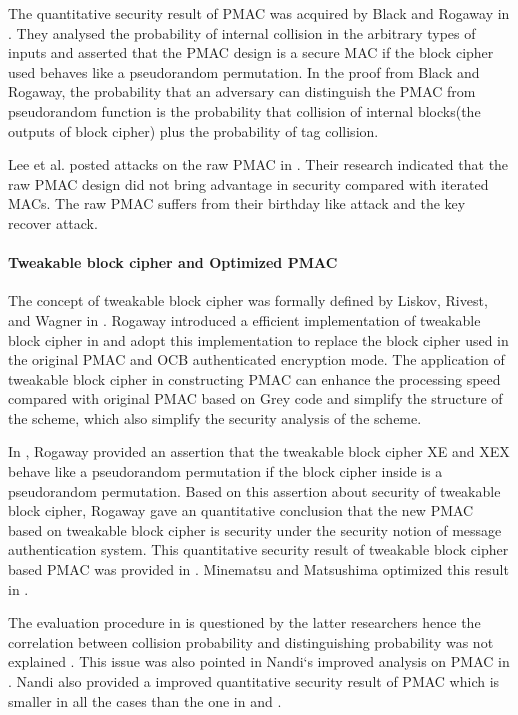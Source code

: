 \documentclass{article}
\begin{document}
The quantitative security result of PMAC was acquired by Black and Rogaway in \cite{pmac}. They analysed the probability of internal collision in the arbitrary types of inputs and asserted that the PMAC design is a secure MAC if the block cipher used behaves like a pseudorandom permutation. In the proof from Black and Rogaway, the probability that an adversary can distinguish the PMAC from pseudorandom function is the probability that collision of internal blocks(the outputs of block cipher) plus the probability of tag collision. 

Lee et al. posted attacks on the raw PMAC in \cite{pmac_forgery}. Their research indicated that the raw PMAC design did not bring advantage in security compared with iterated MACs. The raw PMAC suffers from their birthday like attack and the key recover attack.
\paragraph{Tweakable block cipher and Optimized PMAC}
The concept of tweakable block cipher was formally defined by Liskov, Rivest, and Wagner in \cite{tweak}. Rogaway introduced a efficient implementation of tweakable block cipher in \cite{tweak_pmac}and adopt this implementation to replace the block cipher used in the original PMAC and OCB authenticated encryption mode.
The application of tweakable block cipher in constructing PMAC can enhance the processing speed compared with original PMAC based on Grey code and simplify the structure of the scheme, which also simplify the security analysis of the scheme. 

In \cite{tweak_pmac}, Rogaway provided an assertion that the tweakable block cipher XE and XEX behave like a pseudorandom permutation if the block cipher inside is a pseudorandom permutation. Based on this assertion about security of tweakable block cipher, Rogaway gave an quantitative conclusion that the new PMAC based on tweakable block cipher is security under the security notion of message authentication system. This quantitative security result of tweakable block cipher based PMAC was provided in \cite{tweak_pmac}.
Minematsu and Matsushima optimized this result in \cite{new}. 

The evaluation procedure in \cite{pmac} is questioned by the latter researchers hence the correlation between collision probability and 
distinguishing probability was not explained . This issue was also pointed in Nandi`s improved analysis on PMAC in \cite{improve_pmac}. Nandi also provided a improved quantitative security result of PMAC which is smaller in all the cases than the one in \cite{pmac} and \cite{new}. 
\end{document}
